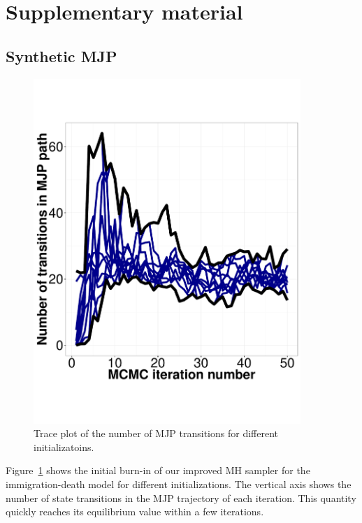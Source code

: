 \section{Supplementary material}

\subsection{Synthetic MJP}

  \begin{figure}[H]
  \centering
  \begin{minipage}[hp]{0.45\linewidth}
  \centering
    \includegraphics [width=0.90\textwidth, angle=0]{figs/exp3_k2_path_transition.pdf}
      \end{minipage}
    \caption{Trace plot of the number of MJP transitions for different initializatoins.}
	\label{fig:Transition_exp}
  \end{figure}

Figure~\ref{fig:Transition_exp} shows the initial burn-in of our improved MH 
sampler for the immigration-death model for different initializations. The vertical 
axis shows the number of state transitions in the MJP trajectory of each iteration. 
This quantity quickly reaches its equilibrium value within a few iterations.\\

